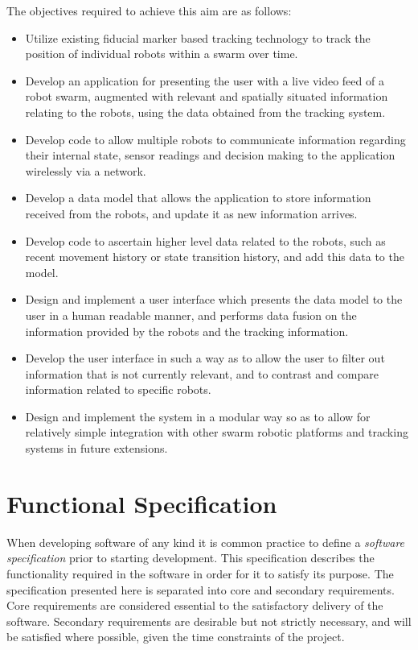 The objectives required to achieve this aim are as follows:

\begin{itemize}
	\item Utilize existing fiducial marker based tracking technology to track the position of individual robots within a swarm over time.
	\item Develop an application for presenting the user with a live video feed of a robot swarm, augmented with relevant and spatially situated information relating to the robots, using the data obtained from the tracking system.
	\item Develop code to allow multiple robots to communicate information regarding their internal state, sensor readings and decision making to the application wirelessly via a network.
	\item Develop a data model that allows the application to store information received from the robots, and update it as new information arrives.
	\item Develop code to ascertain higher level data related to the robots, such as recent movement history or state transition history, and add this data to the model.
	\item Design and implement a user interface which presents the data model to the user in a human readable manner, and performs data fusion on the information provided by the robots and the tracking information.
	\item Develop the user interface in such a way as to allow the user to filter out information that is not currently relevant, and to contrast and compare information related to specific robots.
	\item Design and implement the system in a modular way so as to allow for relatively simple integration with other swarm robotic platforms and tracking systems in future extensions.
\end{itemize}


\section{Functional Specification}
When developing software of any kind it is common practice to define a \textit{software specification} prior to starting development. This specification describes the functionality required in the software in order for it to satisfy its purpose. The specification presented here is separated into core and secondary requirements. Core requirements are considered essential to the satisfactory delivery of the software. Secondary requirements are desirable but not strictly necessary, and will be satisfied where possible, given the time constraints of the project.

